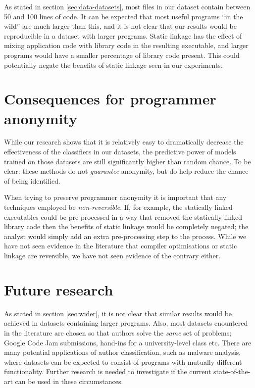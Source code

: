 \documentclass[a4paper,11pt]{kth-mag}
\begin{document}
As stated in section \ref{sec:data-datasets}, most files in our dataset contain
between 50 and 100 lines of code. It can be expected that most useful programs
``in the wild'' are much larger than this, and it is not clear that our results
would be reproducible in a dataset with larger programs. Static linkage has the
effect of mixing application code with library code in the resulting
executable, and larger programs would have a smaller percentage of library code
present. This could potentially negate the benefits of static linkage seen in
our experiments.

\section{Consequences for programmer anonymity}
While our research shows that it is relatively easy to dramatically decrease the
effectiveness of the classifiers in our datasets, the predictive power of
models trained on those datasets are still significantly higher than random
chance. To be clear: these methods do not \emph{guarantee} anonymity, but do
help reduce the chance of being identified.

When trying to preserve programmer anonymity it is important that any
techniques employed be \emph{non-reversible}. If, for example, the statically
linked executables could be pre-processed in a way that removed the statically
linked library code then the benefits of static linkage would be completely
negated; the analyst would simply add an extra pre-processing step to the
process. While we have not seen evidence in the literature that compiler
optimisations or static linkage are reversible, we have not seen evidence of
the contrary either.

\section{Future research}
As stated in section \ref{sec:wider}, it is not clear that similar results
would be achieved in datasets containing larger programs. Also, most datasets
enountered in the literature are chosen so that authors solve the \emph{same}
set of problems; Google Code Jam submissions, hand-ins for a university-level
class etc. There are many potential applications of author classification, such
as malware analysis, where datasets can be expected to consist of programs with
mutually different functionality. Further research is needed to investigate if
the current state-of-the-art can be used in these circumstances. 
\end{document}
